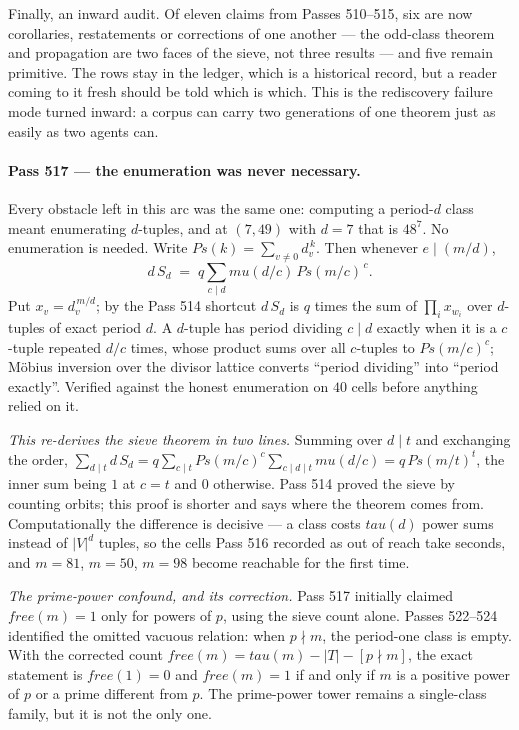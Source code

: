 \documentclass[12pt,a4paper]{article}
\def\mathrm#1{#1}%
\def\mu{mu}%
\def\tau{tau}%
\theoremstyle{definition}
\begin{document}
Finally, an inward audit.  Of eleven claims from Passes 510--515, six are now
corollaries, restatements or corrections of one another --- the odd-class
theorem and propagation are two faces of the sieve, not three results --- and
five remain primitive.  The rows stay in the ledger, which is a historical
record, but a reader coming to it fresh should be told which is which.  This is
the rediscovery failure mode turned inward: a corpus can carry two generations
of one theorem just as easily as two agents can.

\paragraph{Pass 517 --- the enumeration was never necessary.}
Every obstacle left in this arc was the same one: computing a period-$d$ class
meant enumerating $d$-tuples, and at $(7,49)$ with $d=7$ that is $48^{7}$.  No
enumeration is needed.  Write $\mathrm{Ps}(k)=\sum_{v\neq0}d_v^{\,k}$.  Then
whenever $e\mid(m/d)$,
\[
d\,S_d \;=\; q\sum_{c\mid d}\mu(d/c)\,\mathrm{Ps}(m/c)^{\,c}.
\]
Put $x_v=d_v^{\,m/d}$; by the Pass 514 shortcut $d\,S_d$ is $q$ times the sum of
$\prod_i x_{w_i}$ over $d$-tuples of exact period $d$.  A $d$-tuple has period
dividing $c\mid d$ exactly when it is a $c$-tuple repeated $d/c$ times, whose
product sums over all $c$-tuples to $\mathrm{Ps}(m/c)^{c}$; M\"obius inversion
over the divisor lattice converts ``period dividing'' into ``period exactly''.
Verified against the honest enumeration on $40$ cells before anything relied on
it.

\emph{This re-derives the sieve theorem in two lines.}  Summing over $d\mid t$
and exchanging the order,
$\sum_{d\mid t}d\,S_d=q\sum_{c\mid t}\mathrm{Ps}(m/c)^{c}\sum_{c\mid d\mid t}
\mu(d/c)=q\,\mathrm{Ps}(m/t)^{t}$, the inner sum being $1$ at $c=t$ and $0$
otherwise.  Pass 514 proved the sieve by counting orbits; this proof is shorter
and says where the theorem comes from.  Computationally the difference is
decisive --- a class costs $\tau(d)$ power sums instead of $\lvert V\rvert^{d}$
tuples, so the cells Pass 516 recorded as out of reach take seconds, and
$m=81$, $m=50$, $m=98$ become reachable for the first time.

\emph{The prime-power confound, and its correction.}  Pass 517 initially
claimed $\mathrm{free}(m)=1$ only for powers of $p$, using the sieve count
alone.  Passes 522--524 identified the omitted vacuous relation: when
$p\nmid m$, the period-one class is empty.  With the corrected count
$\mathrm{free}(m)=\tau(m)-\lvert T\rvert-[p\nmid m]$, the exact statement is
$\mathrm{free}(1)=0$ and $\mathrm{free}(m)=1$ if and only if $m$ is a
positive power of $p$ or a prime different from $p$.  The prime-power tower
remains a single-class family, but it is not the only one.
\end{document}
